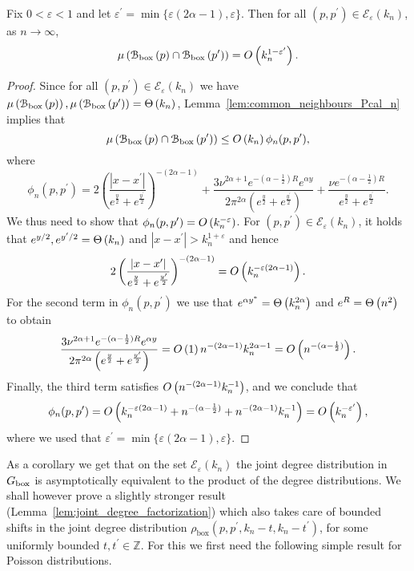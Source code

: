 \begin{lemma}\label{cor:expected_common_neighbours_Ecal_set}
Fix $0 < \varepsilon < 1$ and let $\varepsilon^\prime = \min\{\varepsilon(2\alpha - 1),\varepsilon\}$. Then for all $(p,p^\prime) \in \mathcal{E}_\varepsilon(k_n)$, as $n \to \infty$,
\[
	\mu\left({\mathcal B}_{\text{box}}\left(p\right) \cap {\mathcal B}_{\text{box}}\left(p^\prime\right)\right) = O\left(k_n^{1-\varepsilon^\prime}\right).
\] 
\end{lemma}

\begin{proof}
Since for all $(p,p^\prime) \in \mathcal{E}_\varepsilon(k_n)$ we have $\mu\left({\mathcal B}_{\text{box}}\left(p\right)\right), \mu\left({\mathcal B}_{\text{box}}\left(p^\prime\right)\right) = \Theta\left(k_n\right)$, Lemma~\ref{lem:common_neighbours_Pcal_n} implies that
\[
	\mu\left({\mathcal B}_{\text{box}}\left(p\right) \cap {\mathcal B}_{\text{box}}\left(p^\prime\right)\right) \le O\left(k_n\right) \phi_n(p,p^\prime),
\]
where
\[
	\phi_n(p,p^\prime) = 2\left(\frac{|x - x^\prime|}{e^{\frac{y}{2}} + e^{\frac{y^\prime}{2}}}\right)^{-(2\alpha - 1)} 
		+ \frac{3 \nu^{2\alpha + 1}e^{-(\alpha - \frac{1}{2})R} e^{\alpha y}}{2 \pi^{2\alpha}\left(
		e^{\frac{y}{2}} + e^{\frac{y^\prime}{2}}\right)}
		+ \frac{\nu e^{-(\alpha - \frac{1}{2})R}}{e^{\frac{y}{2}} + e^{\frac{y^\prime}{2}}}. 
\]
We thus need to show that $\phi_n(p,p^\prime) = O\left(k_n^{-\varepsilon}\right)$. For $(p,p^\prime) \in \mathcal{E}_\varepsilon(k_n)$, it holds that $e^{y/2}, e^{y^\prime/2} = \Theta\left(k_n\right)$ and $|x - x^\prime| > k_n^{1+\varepsilon}$ and hence
\begin{align*}
	 2\left(\frac{|x - x^\prime|}{e^{\frac{y}{2}} + e^{\frac{y^\prime}{2}}}\right)^{-(2\alpha - 1)}
	 =	O\left(k_n^{-\varepsilon(2\alpha - 1)}\right).
\end{align*}
For the second term in $\phi_n(p,p^\prime)$ we use that $e^{\alpha y^\ast} = \Theta\left(k_n^{2\alpha}\right)$ and $e^{R} = \Theta\left(n^2\right)$ to obtain
\[
	\frac{3 \nu^{2\alpha + 1}e^{-(\alpha - \frac{1}{2})R} e^{\alpha y}}{2 \pi^{2\alpha}\left(
			e^{\frac{y}{2}} + e^{\frac{y^\prime}{2}}\right)}
	= O\left(1\right) n^{-(2\alpha - 1)} k_n^{2\alpha - 1} = O\left(n^{-(\alpha - \frac{1}{2})}\right).
\]
Finally, the third term satisfies $O\left(n^{-(2\alpha - 1)}k_n^{-1}\right)$, and we conclude that
\[
	\phi_n(p,p^\prime) = O\left(k_n^{-\varepsilon(2\alpha - 1)} + n^{-(\alpha - \frac{1}{2})}
	+ n^{-(2\alpha - 1)}k_n^{-1}\right) = O\left(k_n^{-\varepsilon^\prime}\right),
\]
where we used that $\varepsilon^\prime = \min\{\varepsilon(2\alpha - 1),\varepsilon\}$. 
\end{proof}

As a corollary we get that on the set $\mathcal{E}_\varepsilon(k_n)$ the joint degree distribution in $G_{\mathrm{box}}$ is asymptotically equivalent to the product of the degree distributions. We shall however prove a slightly stronger result (Lemma~\ref{lem:joint_degree_factorization}) which also takes care of bounded shifts in the joint degree distribution $\rho_{\text{box}}(p,p^\prime,k_n - t,k_n - t^\prime)$, for some uniformly bounded $t, t^\prime \in \mathbb{Z}$. For this we first need the following simple result for Poisson distributions.

